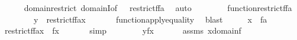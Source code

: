 \begin{isabellebody}
\ \ \ \ \isamarkupfalse%
\ domain{\isacharunderscore}{\kern0pt}restrict\ domainI{\isacharbrackleft}{\kern0pt}of\ {\isacharunderscore}{\kern0pt}\ {\isacharunderscore}{\kern0pt}\ {\isachardoublequoteopen}restrict{\isacharparenleft}{\kern0pt}f{\isacharcomma}{\kern0pt}f{\isacharminus}{\kern0pt}{\isacharbackquote}{\kern0pt}{\isacharbackquote}{\kern0pt}a{\isacharparenright}{\kern0pt}{\isachardoublequoteclose}{\isacharbrackright}{\kern0pt}\ \isamarkupfalse%
\ auto\isanewline
\ \ \isamarkupfalse%
\ \isanewline
\ \ \isamarkupfalse%
\ {\isacartoucheopen}function{\isacharparenleft}{\kern0pt}restrict{\isacharparenleft}{\kern0pt}f{\isacharcomma}{\kern0pt}f{\isacharminus}{\kern0pt}{\isacharbackquote}{\kern0pt}{\isacharbackquote}{\kern0pt}a{\isacharparenright}{\kern0pt}{\isacharparenright}{\kern0pt}{\isacartoucheclose}\ \isanewline
\ \ \isamarkupfalse%
\ \isanewline
\ \ \isamarkupfalse%
\ {\isachardoublequoteopen}y\ {\isacharequal}{\kern0pt}\ restrict{\isacharparenleft}{\kern0pt}f{\isacharcomma}{\kern0pt}f{\isacharminus}{\kern0pt}{\isacharbackquote}{\kern0pt}{\isacharbackquote}{\kern0pt}a{\isacharparenright}{\kern0pt}{\isacharbackquote}{\kern0pt}x{\isachardoublequoteclose}\ \isanewline
\ \ \ \ \isamarkupfalse%
\ function{\isacharunderscore}{\kern0pt}apply{\isacharunderscore}{\kern0pt}equality\ \isamarkupfalse%
\ blast\isanewline
\ \ \isamarkupfalse%
\ \isamarkupfalse%
\ {\isacartoucheopen}x\ {\isasymin}\ f{\isacharminus}{\kern0pt}{\isacharbackquote}{\kern0pt}{\isacharbackquote}{\kern0pt}a{\isacartoucheclose}\ \isanewline
\ \ \isamarkupfalse%
\ {\isachardoublequoteopen}restrict{\isacharparenleft}{\kern0pt}f{\isacharcomma}{\kern0pt}f{\isacharminus}{\kern0pt}{\isacharbackquote}{\kern0pt}{\isacharbackquote}{\kern0pt}a{\isacharparenright}{\kern0pt}{\isacharbackquote}{\kern0pt}x\ {\isacharequal}{\kern0pt}\ f{\isacharbackquote}{\kern0pt}x{\isachardoublequoteclose}\ \isanewline
\ \ \ \ \isamarkupfalse%
\ simp\isanewline
\ \ \isamarkupfalse%
\ \isanewline
\ \ \isamarkupfalse%
\ {\isachardoublequoteopen}y{\isacharequal}{\kern0pt}f{\isacharbackquote}{\kern0pt}x{\isachardoublequoteclose}\ \isacommand{{\isachardot}{\kern0pt}}\isamarkupfalse%
\isanewline
\ \ \isamarkupfalse%
\ \isamarkupfalse%
\ assms\ {\isacartoucheopen}x{\isasymin}domain{\isacharparenleft}{\kern0pt}f{\isacharparenright}{\kern0pt}{\isacartoucheclose}\ \isanewline

\end{isabellebody}
